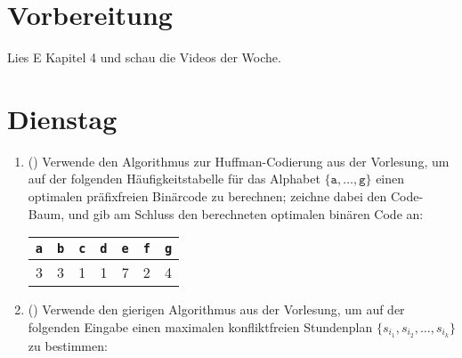 \documentclass{uebung_cs}
\begin{document}
\section*{Vorbereitung}
Lies E Kapitel 4 und schau die Videos der Woche.

\section*{Dienstag}

\begin{aufgabe}\phantom{.}
    \begin{enumerate}
        \item(\warmup) Verwende den Algorithmus zur Huffman-Codierung aus der Vorlesung, um auf der folgenden Häufigkeitstabelle für das Alphabet $\{\texttt a,\dots,\texttt g\}$ einen optimalen präfixfreien Binärcode zu berechnen; zeichne dabei den Code-Baum, und gib am Schluss den berechneten optimalen binären Code an:
        \begin{center}
            \begin{tabular}{ccccccc}
                \texttt{a}&\texttt{b}&\texttt{c}&\texttt{d}&\texttt{e}&\texttt{f}&\texttt{g}\\\hline
                3&3&1&1&7&2&4\\
            \end{tabular}
        \end{center}
        \item (\warmup) Verwende den gierigen Algorithmus aus der Vorlesung, um auf der folgenden Eingabe einen maximalen konfliktfreien Stundenplan $\{s_{i_1}, s_{i_2}, \dots, s_{i_k}\}$ zu bestimmen:
        \begin{center}
\end{center}
\end{enumerate}
\end{aufgabe}
\end{document}
